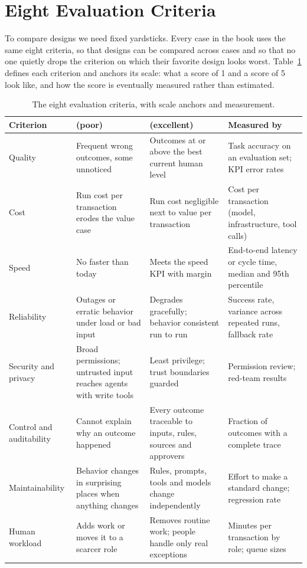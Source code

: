 
\section{Eight Evaluation Criteria}
\label{sec:criteria}

To compare designs we need fixed yardsticks. Every case in the book uses the same eight criteria, so that designs can be compared across cases and so that no one quietly drops the criterion on which their favorite design looks worst. Table~\ref{tab:criteria} defines each criterion and anchors its scale: what a score of 1 and a score of 5 look like, and how the score is eventually measured rather than estimated.

\begin{table}[htbp]
\centering
\small
\caption{The eight evaluation criteria, with scale anchors and measurement.}
\label{tab:criteria}
\begin{tabularx}{\textwidth}{@{}>{\raggedright\arraybackslash}p{2.5cm}>{\raggedright\arraybackslash}X>{\raggedright\arraybackslash}X>{\raggedright\arraybackslash}p{3.1cm}@{}}
\toprule
Criterion & 1 (poor) & 5 (excellent) & Measured by \\
\midrule
Quality & Frequent wrong outcomes, some unnoticed & Outcomes at or above the best current human level & Task accuracy on an evaluation set; KPI error rates \\
Cost & Run cost per transaction erodes the value case & Run cost negligible next to value per transaction & Cost per transaction (model, infrastructure, tool calls) \\
Speed & No faster than today & Meets the speed KPI with margin & End-to-end latency or cycle time, median and 95th percentile \\
Reliability & Outages or erratic behavior under load or bad input & Degrades gracefully; behavior consistent run to run & Success rate, variance across repeated runs, fallback rate \\
Security and privacy & Broad permissions; untrusted input reaches agents with write tools & Least privilege; trust boundaries guarded & Permission review; red-team results \\
Control and auditability & Cannot explain why an outcome happened & Every outcome traceable to inputs, rules, sources and approvers & Fraction of outcomes with a complete trace \\
Maintainability & Behavior changes in surprising places when anything changes & Rules, prompts, tools and models change independently & Effort to make a standard change; regression rate \\
Human workload & Adds work or moves it to a scarcer role & Removes routine work; people handle only real exceptions & Minutes per transaction by role; queue sizes \\
\bottomrule
\end{tabularx}
\end{table}

